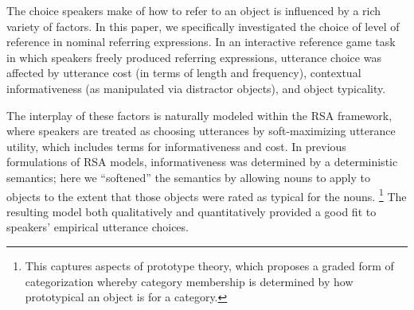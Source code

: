 \documentclass[10pt,letterpaper]{article}
\newcommand{\jd}[1]{\textcolor{Blue}{[jd: #1]}}
\newcommand{\ndg}[1]{\textcolor{Green}{[ndg: #1]}}
\begin{document}

The choice speakers make of how to refer to an object is influenced by a rich variety of factors.
In this paper, we specifically investigated the choice of level of reference in nominal referring expressions. In an interactive reference game task in which speakers freely produced referring expressions, utterance choice was affected by utterance cost (in terms of length and frequency), contextual informativeness (as manipulated via distractor objects), and object typicality.

The interplay of these factors is naturally modeled within the RSA framework, where speakers are treated as choosing utterances by soft-maximizing utterance utility, which includes terms for informativeness and cost. In previous formulations of RSA models, informativeness was determined by a deterministic semantics; here we ``softened'' the semantics by allowing nouns to apply to objects to the extent that those objects were rated as typical for the nouns.%
\footnote{This captures aspects of prototype theory, which proposes a graded form of categorization whereby  category membership is determined by how prototypical an object is for a category.}
 The resulting model both qualitatively and quantitatively provided a good fit to speakers' empirical utterance choices. 



\end{document}

